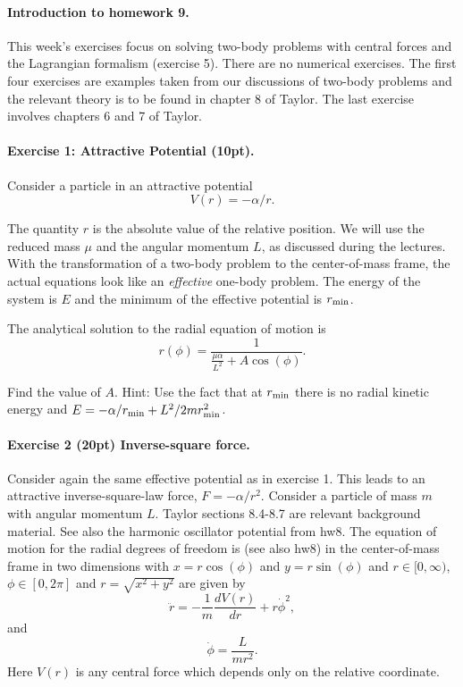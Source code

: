 \documentclass[%
oneside,                 %
final,                   %
10pt]{article}
\begin{document}
\noindent
\paragraph{Introduction to homework 9.}
This week's exercises focus on solving
two-body  problems with central forces and the Lagrangian formalism (exercise 5). There are no numerical exercises. 
The first four exercises are examples taken from our discussions of two-body problems and the relevant theory is to be found in chapter 8 of Taylor. The last exercise involves chapters 6 and 7 of Taylor.

\paragraph{Exercise 1: Attractive Potential (10pt).}
Consider a particle in an attractive potential
\[
V(r)=-\alpha/r.
\]

The quantity $r$ is the absolute value of the relative position. We
will use the reduced mass $\mu$ and the angular momentum $L$, as
discussed during the lectures. With the transformation of a two-body
problem to the center-of-mass frame, the actual equations look like an
\emph{effective} one-body problem. The energy of the system is $E$ and the
minimum of the effective potential is $r_{\rm min}$.

The analytical solution to the radial equation of motion is
\[
r(\phi) = \frac{1}{\frac{\mu\alpha}{L^2}+A\cos{(\phi)}}.
\]

Find the value of $A$. Hint: Use the fact that at $r_{\rm min}$
there is no radial kinetic energy and $E=-\alpha/r_{\rm min}+L^2/2mr_{\rm min}^2$.

\paragraph{Exercise 2 (20pt) Inverse-square force.}
Consider again the same effective potential as in exercise 1. This leads to an attractive inverse-square-law force, $F=-\alpha/r^2$. Consider a particle of mass $m$ with angular momentum $L$. Taylor sections 8.4-8.7 are relevant background material.  See also the harmonic oscillator potential from hw8. The equation of motion for the radial degrees of freedom is (see also hw8) in the center-of-mass frame in two dimensions with $x=r\cos{(\phi)}$ and $y=r\sin{(\phi)}$ and
$r\in [0,\infty)$, $\phi\in [0,2\pi]$ and $r=\sqrt{x^2+y^2}$ are given by
\[
\ddot{r}=-\frac{1}{m}\frac{dV(r)}{dr}+r\dot{\phi}^2,
\]
and
\[
\dot{\phi}=\frac{L}{m r^2}.
\]
Here $V(r)$ is any central force which depends only on the relative coordinate.
\end{document}
